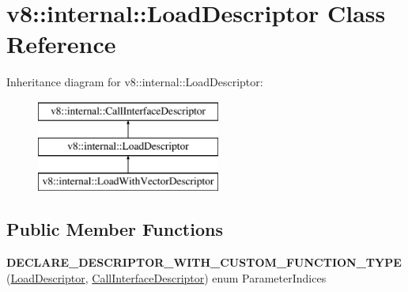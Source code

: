 \hypertarget{classv8_1_1internal_1_1_load_descriptor}{}\section{v8\+:\+:internal\+:\+:Load\+Descriptor Class Reference}
\label{classv8_1_1internal_1_1_load_descriptor}
Inheritance diagram for v8\+:\+:internal\+:\+:Load\+Descriptor\+:\begin{figure}[H]
\begin{center}
\leavevmode
\includegraphics[height=3.000000cm]{classv8_1_1internal_1_1_load_descriptor}
\end{center}
\end{figure}
\subsection*{Public Member Functions}
\begin{DoxyCompactItemize}
\item 
{\bfseries D\+E\+C\+L\+A\+R\+E\+\_\+\+D\+E\+S\+C\+R\+I\+P\+T\+O\+R\+\_\+\+W\+I\+T\+H\+\_\+\+C\+U\+S\+T\+O\+M\+\_\+\+F\+U\+N\+C\+T\+I\+O\+N\+\_\+\+T\+Y\+PE} (\hyperlink{classv8_1_1internal_1_1_load_descriptor}{Load\+Descriptor}, \hyperlink{classv8_1_1internal_1_1_call_interface_descriptor}{Call\+Interface\+Descriptor}) enum Parameter\+Indices\hypertarget{classv8_1_1internal_1_1_load_descriptor_a912d2061b787b55058880188da062ad5}{}\label{classv8_1_1internal_1_1_load_descriptor_a912d2061b787b55058880188da062ad5}

\end{DoxyCompactItemize}
